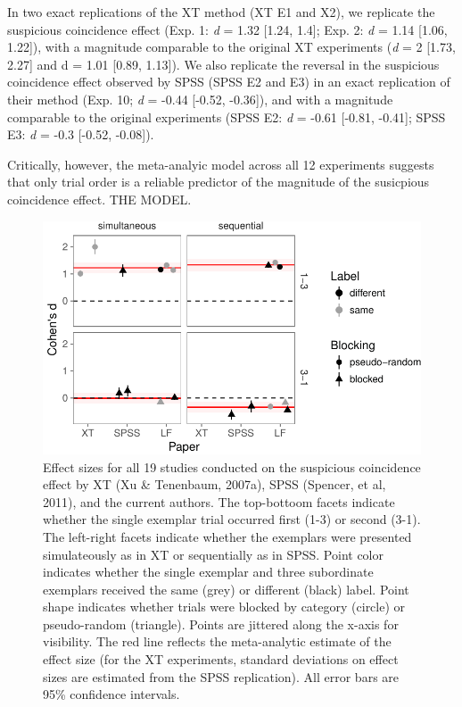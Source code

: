 \documentclass[english,floatsintext,man]{apa6}
\newcounter{author}
\theoremstyle{definition}
\theoremstyle{definition}
\theoremstyle{remark}
\begin{document}
In two exact replications of the XT method (XT E1 and X2), we replicate
the suspicious coincidence effect (Exp. 1: \emph{d} = 1.32 {[}1.24,
1.4{]}; Exp. 2: \emph{d} = 1.14 {[}1.06, 1.22{]}), with a magnitude
comparable to the original XT experiments (\emph{d} = 2 {[}1.73, 2.27{]}
and d = 1.01 {[}0.89, 1.13{]}). We also replicate the reversal in the
suspicious coincidence effect observed by SPSS (SPSS E2 and E3) in an
exact replication of their method (Exp. 10; \emph{d} = -0.44 {[}-0.52,
-0.36{]}), and with a magnitude comparable to the original experiments
(SPSS E2: \emph{d} = -0.61 {[}-0.81, -0.41{]}; SPSS E3: \emph{d} = -0.3
{[}-0.52, -0.08{]}).

Critically, however, the meta-analyic model across all 12 experiments
suggests that only trial order is a reliable predictor of the magnitude
of the susicpious coincidence effect. THE MODEL.

\begin{figure}
\centering
\includegraphics{xtmem_files/figure-latex/unnamed-chunk-5-1.pdf}
\caption{\label{fig:unnamed-chunk-5}Effect sizes for all 19 studies
conducted on the suspicious coincidence effect by XT (Xu \& Tenenbaum,
2007a), SPSS (Spencer, et al, 2011), and the current authors. The
top-bottoom facets indicate whether the single exemplar trial occurred
first (1-3) or second (3-1). The left-right facets indicate whether the
exemplars were presented simulateously as in XT or sequentially as in
SPSS. Point color indicates whether the single exemplar and three
subordinate exemplars received the same (grey) or different (black)
label. Point shape indicates whether trials were blocked by category
(circle) or pseudo-random (triangle). Points are jittered along the
x-axis for visibility. The red line reflects the meta-analytic estimate
of the effect size (for the XT experiments, standard deviations on
effect sizes are estimated from the SPSS replication). All error bars
are 95\% confidence intervals.}
\end{figure}
\end{document}
